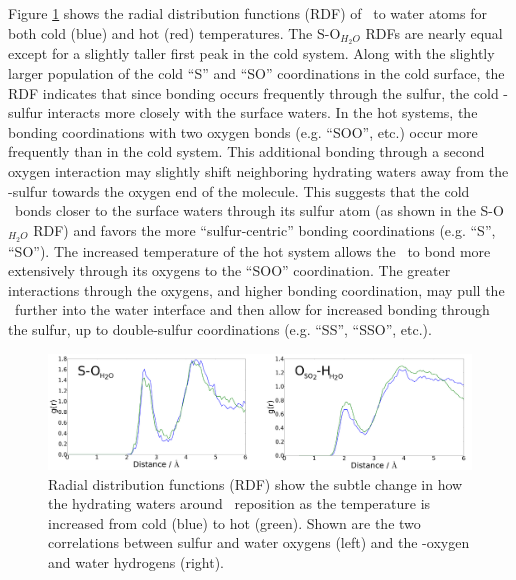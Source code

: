 \documentclass{article}
\begin{document}

Figure \ref{fig:rdf} shows the radial distribution functions (RDF) of \suldiox~to water atoms for both cold (blue) and hot (red) temperatures. The S-O$_{H_2O}$ RDFs are nearly equal except for a slightly taller first peak in the cold system. Along with the slightly larger population of the cold ``S'' and ``SO'' coordinations in the cold surface, the RDF indicates that since bonding occurs frequently through the sulfur, the cold \suldiox-sulfur interacts more closely with the surface waters. In the hot systems, the bonding coordinations with two oxygen bonds (e.g. ``SOO'', etc.) occur more frequently than in the cold system. This additional bonding through a second oxygen interaction may slightly shift neighboring hydrating waters away from the \suldiox-sulfur towards the oxygen end of the molecule. This suggests that the cold \suldiox~bonds closer to the surface waters through its sulfur atom (as shown in the S-O$_{H_2O}$ RDF) and favors the more ``sulfur-centric'' bonding coordinations (e.g. ``S'', ``SO''). The increased temperature of the hot system allows the \suldiox~to bond more extensively through its oxygens to the ``SOO'' coordination. The greater interactions through the oxygens, and higher bonding coordination, may pull the \suldiox~further into the water interface and then allow for increased bonding through the sulfur, up to double-sulfur coordinations (e.g. ``SS'', ``SSO'', etc.).

\begin{figure}[h!]
	\begin{center}
		\includegraphics[scale=1.0]{rdf-small.png}
		\caption{Radial distribution functions (RDF) show the subtle change in how the hydrating waters around \suldiox~reposition as the temperature is increased from cold (blue) to hot (green). Shown are the two correlations between sulfur and water oxygens (left) and the \suldiox-oxygen and water hydrogens (right).}
		\label{fig:rdf}
	\end{center}
\end{figure}
\end{document}
